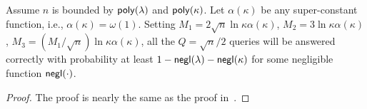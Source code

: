 \begin{theorem}[Correctness]
    Assume $n$ is bounded by $\mathsf{poly}(\lambda)$ and $\mathsf{poly}(\kappa)$. 
    Let $\alpha(\kappa)$ be any super-constant function, i.e., $\alpha(\kappa)=\omega(1)$. Setting $M_1 = 2\sqrt{n}\ln \kappa\alpha(\kappa)$, $M_2 = 3\ln \kappa\alpha(\kappa)$, $M_3=(M_1/\sqrt{n})\ln \kappa\alpha(\kappa)$, all the $Q= \sqrt{n}/2$ queries will be answered correctly with probability at least $1-\mathsf{negl}(\lambda)-\mathsf{negl}(\kappa)$ for some negligible function $\mathsf{negl}(\cdot)$.
\end{theorem}

\begin{proof}
    The proof is nearly the same as the proof in~.
\end{proof}
